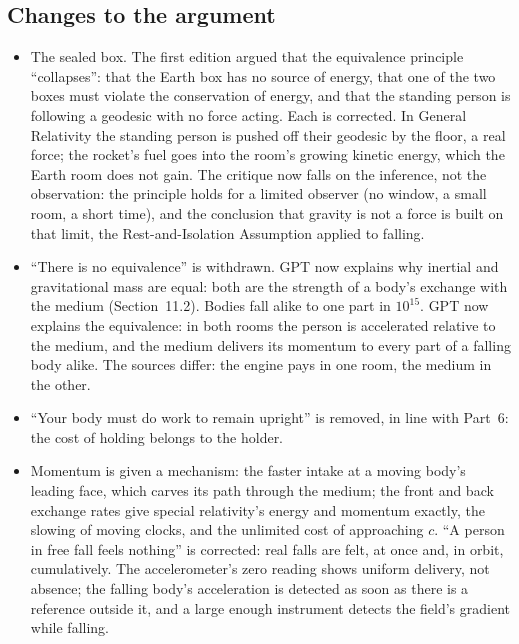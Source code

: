 \subsection*{Changes to the argument}
\begin{itemize}
  \item The sealed box. The first edition argued that the equivalence principle ``collapses'': that the Earth box has no source of energy, that one of the two boxes must violate the conservation of energy, and that the standing person is following a geodesic with no force acting. Each is corrected. In General Relativity the standing person is pushed off their geodesic by the floor, a real force; the rocket's fuel goes into the room's growing kinetic energy, which the Earth room does not gain. The critique now falls on the inference, not the observation: the principle holds for a limited observer (no window, a small room, a short time), and the conclusion that gravity is not a force is built on that limit, the Rest-and-Isolation Assumption applied to falling.
  \item ``There is no equivalence'' is withdrawn. GPT now explains why inertial and gravitational mass are equal: both are the strength of a body's exchange with the medium (Section~11.2). Bodies fall alike to one part in $10^{15}$. GPT now explains the equivalence: in both rooms the person is accelerated relative to the medium, and the medium delivers its momentum to every part of a falling body alike. The sources differ: the engine pays in one room, the medium in the other.
  \item ``Your body must do work to remain upright'' is removed, in line with Part~6: the cost of holding belongs to the holder.
  \item Momentum is given a mechanism: the faster intake at a moving body's leading face, which carves its path through the medium; the front and back exchange rates give special relativity's energy and momentum exactly, the slowing of moving clocks, and the unlimited cost of approaching $c$. ``A person in free fall feels nothing'' is corrected: real falls are felt, at once and, in orbit, cumulatively. The accelerometer's zero reading shows uniform delivery, not absence; the falling body's acceleration is detected as soon as there is a reference outside it, and a large enough instrument detects the field's gradient while falling.

\end{itemize}
